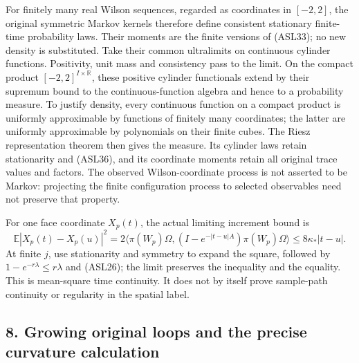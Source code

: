 \documentclass[11pt]{article}
\begin{document}
For finitely many real Wilson sequences, regarded as coordinates in \([-2,2]\), the original symmetric Markov kernels therefore define consistent stationary finite-time probability laws. Their moments are the finite versions of (ASL33); no new density is substituted. Take their common ultralimits on continuous cylinder functions. Positivity, unit mass and consistency pass to the limit. On the compact product \([-2,2]^{I\times\mathbb R}\), these positive cylinder functionals extend by their supremum bound to the continuous-function algebra and hence to a probability measure. To justify density, every continuous function on a compact product is uniformly approximable by functions of finitely many coordinates; the latter are uniformly approximable by polynomials on their finite cubes. The Riesz representation theorem then gives the measure. Its cylinder laws retain stationarity and (ASL36), and its coordinate moments retain all original trace values and factors. The observed Wilson-coordinate process is not asserted to be Markov: projecting the finite configuration process to selected observables need not preserve that property.

For one face coordinate \(X_p(t)\), the actual limiting increment bound is
\[
 \mathbb E|X_p(t)-X_p(u)|^2
 =2\langle\pi(W_p)\Omega,(I-e^{-|t-u|A})\pi(W_p)\Omega\rangle
 \le8\kappa_*|t-u|.
 \tag{ASL38}
\]
At finite \(j\), use stationarity and symmetry to expand the square, followed by \(1-e^{-r\lambda}\le r\lambda\) and (ASL26); the limit preserves the inequality and the equality. This is mean-square time continuity. It does not by itself prove sample-path continuity or regularity in the spatial label.

\subsection*{8. Growing original loops and the precise curvature calculation}
\end{document}
